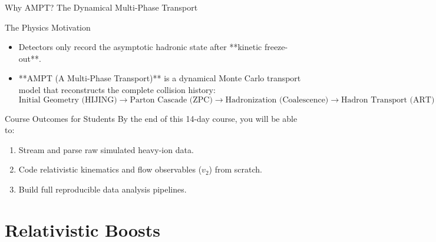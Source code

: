 \documentclass[aspectratio=169]{beamer}
\begin{document}
\begin{frame}{Why AMPT? The Dynamical Multi-Phase Transport}
    \begin{block}{The Physics Motivation}
        \begin{itemize}
            \item Detectors only record the asymptotic hadronic state after **kinetic freeze-out**.
            \item **AMPT (A Multi-Phase Transport)** is a dynamical Monte Carlo transport model that reconstructs the complete collision history:
            \[ \text{Initial Geometry (HIJING)} \rightarrow \text{Parton Cascade (ZPC)} \rightarrow \text{Hadronization (Coalescence)} \rightarrow \text{Hadron Transport (ART)} \]
        \end{itemize}
    \end{block}
    \begin{block}{Course Outcomes for Students}
        By the end of this 14-day course, you will be able to:
        \begin{enumerate}
            \item Stream and parse raw simulated heavy-ion data.
            \item Code relativistic kinematics and flow observables ($v_2$) from scratch.
            \item Build full reproducible data analysis pipelines.
        \end{enumerate}
    \end{block}
\end{frame}

\section{Relativistic Boosts}
\end{document}
